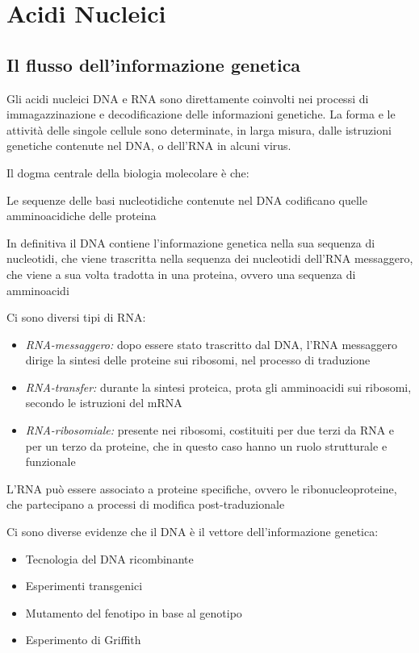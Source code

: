 \part{Acidi Nucleici}


\chapter{Il flusso dell'informazione genetica}



Gli acidi nucleici DNA e RNA sono direttamente coinvolti nei processi di immagazzinazione e decodificazione delle informazioni genetiche. La forma e le attività delle singole cellule sono determinate, in larga misura, dalle istruzioni genetiche contenute nel DNA, o dell'RNA in alcuni virus.

Il dogma centrale della biologia molecolare è che:
\begin{quoting}
Le sequenze delle basi nucleotidiche contenute nel DNA codificano quelle amminoacidiche delle proteina
\end{quoting}

In definitiva il DNA contiene l'informazione genetica nella sua sequenza di nucleotidi, che viene trascritta nella sequenza dei nucleotidi dell'RNA messaggero, che viene a sua volta tradotta in una proteina, ovvero una sequenza di amminoacidi

Ci sono diversi tipi di RNA:
\begin{itemize}
\item \emph{RNA-messaggero:} dopo essere stato trascritto dal DNA, l'RNA messaggero dirige la sintesi delle proteine sui ribosomi, nel processo di traduzione
\item \emph{RNA-transfer:} durante la sintesi proteica, prota gli amminoacidi sui ribosomi, secondo le istruzioni del mRNA
\item \emph{RNA-ribosomiale:} presente nei ribosomi, costituiti per due terzi da RNA e per un terzo da proteine, che in questo caso hanno un ruolo strutturale e funzionale
\end{itemize}

L'RNA può essere associato a proteine specifiche, ovvero le ribonucleoproteine, che partecipano a processi di modifica post-traduzionale

Ci sono diverse evidenze che il DNA è il vettore dell'informazione genetica:
\begin{itemize}
\item Tecnologia del DNA ricombinante
\item Esperimenti transgenici
\item Mutamento del fenotipo in base al genotipo
\item Esperimento di Griffith
\end{itemize}

